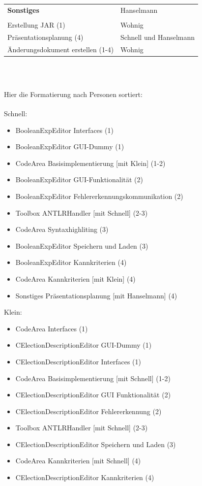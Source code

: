 \documentclass[a4paper]{scrreprt}
\begin{document}
\begin{tabular}{ | p{7cm} | p{7cm} |}
	\hline	
	
	\rule{0pt}{15pt}\textbf {Sonstiges} & Hanselmann\\
	&\\
	\hline
	Erstellung JAR (1) & Wohnig \\
	\hline
	Präsentationsplanung (4) & Schnell und Hanselmann  \\
	\hline
	Änderungsdokument erstellen (1-4) & Wohnig \\
	\hline
	
    \end{tabular}\\\\
    \flushbottom

Hier die Formatierung nach Personen sortiert: \\\\
Schnell:
\begin{itemize} 
\item BooleanExpEditor Interfaces (1)
\item BooleanExpEditor GUI-Dummy (1)
\item CodeArea Basisimplementierung [mit Klein] (1-2)
\item BooleanExpEditor GUI-Funktionalität (2)
\item BooleanExpEditor Fehlererkennungskommunikation (2) 
\item Toolbox ANTLRHandler [mit Schnell] (2-3) 
\item CodeArea Syntaxhighliting (3)
\item BooleanExpEditor Speichern und Laden (3) 
\item BooleanExpEditor Kannkriterien (4)
\item CodeArea Kannkriterien [mit Klein] (4)
\item Sonstiges Präsentationsplanung [mit Hanselmann] (4)
\end{itemize} 
\vspace{8mm}
Klein: 
\begin{itemize}
\item CodeArea Interfaces (1)
\item CElectionDescriptionEditor GUI-Dummy (1) 
\item CElectionDescriptionEditor Interfaces (1)
\item CodeArea Basisimplementierung [mit Schnell] (1-2)
\item CElectionDescriptionEditor GUI Funktionalität (2)
\item CElectionDescriptionEditor Fehlererkennung (2) 
\item Toolbox ANTLRHandler [mit Schnell] (2-3) 
\item CElectionDescriptionEditor Speichern und Laden (3)
\item CodeArea Kannkriterien [mit Schnell] (4)
\item CElectionDescriptionEditor Kannkriterien (4)
\end{itemize} 
\end{document}

